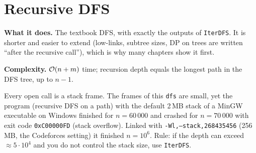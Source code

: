 \clneed
\section{Recursive DFS}
\label{sec:cl-recdfs}

\textbf{What it does.} The textbook DFS, with exactly the outputs of \texttt{IterDFS}. It is shorter and easier to extend (low-links, subtree sizes, DP on trees are written ``after the recursive call''), which is why many chapters show it first.

\textbf{Complexity.} $\mathcal{O}(n+m)$ time; recursion depth equals the longest path in the DFS tree, up to $n-1$.

\begin{warningbox}
Every open call is a stack frame. The frames of this \texttt{dfs} are small, yet the program  (recursive DFS on a path) with the default 2\,MB stack of a MinGW executable on Windows finished for $n=60\,000$ and crashed for $n=70\,000$ with exit code \texttt{0xC00000FD} (stack overflow). Linked with \texttt{-Wl,--stack,268435456} (256\,MB, the Codeforces setting) it finished $n=10^6$. Rule: if the depth can exceed $\approx 5\cdot10^4$ and you do not control the stack size, use \texttt{IterDFS}.
\end{warningbox}

\begin{diagrambox}
\end{diagrambox}

